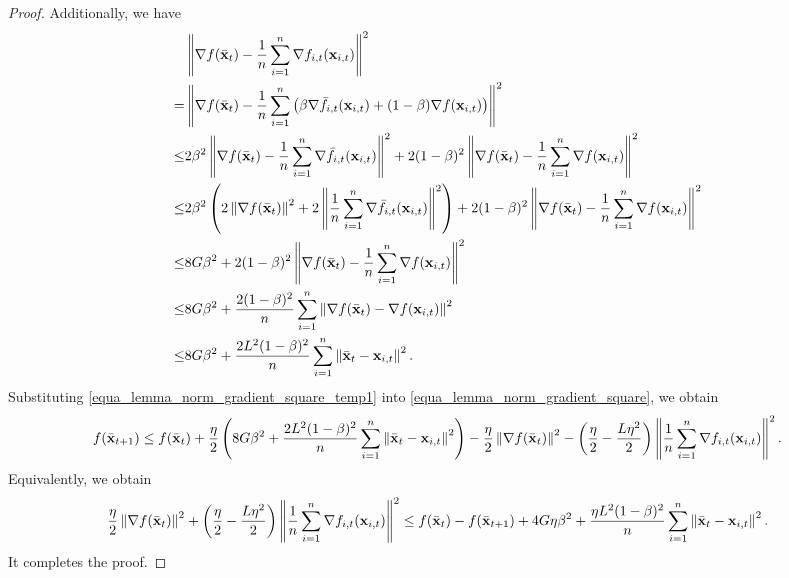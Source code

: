 \documentclass{article}
\begin{document}
\begin{proof}
Additionally, we have
\begin{align}
\nonumber
& \left\lVert\nabla f(\bar{{\bf x}}_t) -\frac{1}{n}\sum_{i=1}^n \nabla f_{i,t}({\bf x}_{i,t})\right\rVert^2 \\ \nonumber
= & \left\lVert\nabla f(\bar{{\bf x}}_t) -\frac{1}{n}\sum_{i=1}^n \left( \beta \nabla \bar{f}_{i,t}({\bf x}_{i,t}) + (1-\beta) \nabla f({\bf x}_{i,t})  \right)\right\rVert^2 \\ \nonumber
\le & 2\beta^2\left\lVert\nabla f(\bar{{\bf x}}_t) -\frac{1}{n}\sum_{i=1}^n \nabla \bar{f}_{i,t}({\bf x}_{i,t})  \right\rVert^2 + 2(1-\beta)^2 \left\lVert \nabla f(\bar{{\bf x}}_t) - \frac{1}{n}\sum_{i=1}^n \nabla f({\bf x}_{i,t}) \right\rVert^2\\ \nonumber
\le & 2\beta^2\left( 2\left\lVert\nabla f(\bar{{\bf x}}_t)\right\rVert^2 + 2\left\lVert\frac{1}{n}\sum_{i=1}^n \nabla \bar{f}_{i,t}({\bf x}_{i,t})  \right\rVert^2 \right) + 2(1-\beta)^2 \left\lVert \nabla f(\bar{{\bf x}}_t) - \frac{1}{n}\sum_{i=1}^n \nabla f({\bf x}_{i,t}) \right\rVert^2\\ \nonumber
\le & 8G\beta^2 + 2(1-\beta)^2 \left\lVert \nabla f(\bar{{\bf x}}_t) - \frac{1}{n}\sum_{i=1}^n \nabla f({\bf x}_{i,t}) \right\rVert^2\\ \nonumber
\le & 8G\beta^2 +  \frac{2(1-\beta)^2}{n}\sum_{i=1}^n\left\lVert \nabla f(\bar{{\bf x}}_t) -  \nabla f({\bf x}_{i,t}) \right\rVert^2\\ \label{equa_lemma_norm_gradient_square_temp1}
\le & 8G\beta^2 +  \frac{2L^2(1-\beta)^2}{n}\sum_{i=1}^n\left\lVert\bar{{\bf x}}_t - {\bf x}_{i,t} \right\rVert^2.
\end{align}
Substituting \eqref{equa_lemma_norm_gradient_square_temp1} into \eqref{equa_lemma_norm_gradient_square}, we obtain
\begin{align}
\nonumber
f(\bar{{\bf x}}_{t+1})\le f(\bar{{\bf x}}_t) + \frac{\eta}{2}\left( 8G\beta^2 +  \frac{2L^2(1-\beta)^2}{n}\sum_{i=1}^n\left\lVert\bar{{\bf x}}_t - {\bf x}_{i,t} \right\rVert^2 \right) - \frac{\eta}{2}\left\lVert\nabla f(\bar{{\bf x}}_t)\right\rVert^2 - \left( \frac{\eta}{2} - \frac{L\eta^2}{2} \right)\left\lVert\frac{1}{n}\sum_{i=1}^n \nabla f_{i,t}({\bf x}_{i,t})\right\rVert^2.
\end{align} Equivalently, we obtain
\begin{align}
\nonumber
\frac{\eta}{2}\left\lVert\nabla f(\bar{{\bf x}}_t)\right\rVert^2 + \left( \frac{\eta}{2} - \frac{L\eta^2}{2} \right)\left\lVert\frac{1}{n}\sum_{i=1}^n \nabla f_{i,t}({\bf x}_{i,t})\right\rVert^2 \le f(\bar{{\bf x}}_t) - f(\bar{{\bf x}}_{t+1}) + 4G\eta\beta^2 +  \frac{\eta L^2(1-\beta)^2}{n}\sum_{i=1}^n\left\lVert\bar{{\bf x}}_t - {\bf x}_{i,t} \right\rVert^2.
\end{align} It completes the proof.



\end{proof}
\end{document}
